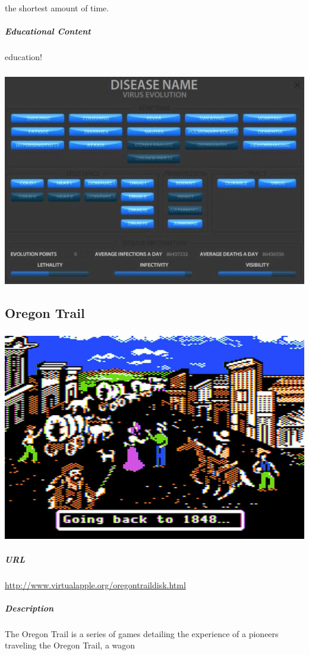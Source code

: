 the shortest amount of time.\subparagraph{Educational Content}education!\subparagraph{}\includegraphics[width = \textwidth]{img/pandemic_screen.jpg}\newpage\subsection{Oregon Trail}\subparagraph{}\includegraphics[width = \textwidth]{img/oregon_title.jpg}\subparagraph{URL}\url{http://www.virtualapple.org/oregontraildisk.html}\subparagraph{Description}The Oregon Trail is a series of games detailing the experience of a pioneers traveling the Oregon Trail, a wagon 